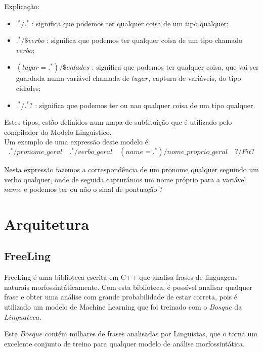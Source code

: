 \documentclass[11pt]{article} %
\begin{document}
Explicação:
\begin{itemize}
\item $.^* / .^*$ : significa que podemos ter qualquer coisa de um tipo qualquer;
\item $. ^* / \$verbo$ : significa que podemos ter qualquer coisa de um tipo chamado $verbo$;
\item $(lugar=.^*) / \$cidades$ : significa que podemos ter qualquer coisa, que vai ser guardada numa variável chamada de $lugar$, captura de variáveis, do tipo cidades;
\item  $.^* / .^* ?$ : significa que podemos ter ou nao qualquer coisa de um tipo qualquer.\\
\end{itemize}

Estes tipos, estão definidos num mapa de subtituição que é utilizado pelo compilador do Modelo Linguístico.\\

Um exemplo de uma expressão deste modelo é:
\begin{equation}
.^* /  pronome\_geral \quad  .^* /  verbo\_geral \quad (name=.^*) / nome\_proprio\_geral \quad  ? / Fit ?
\end{equation}

Nesta expressão fazemos a correspondência de um pronome qualquer seguindo um verbo qualquer, onde de seguida capturámos um nome próprio para a variável $name$ e podemos ter ou não o sinal de pontuação $?$

\section{Arquitetura}

\hspace{11pt} 

\subsection{FreeLing}

\hspace{11pt} FreeLing é uma biblioteca escrita em C++ que analisa frases de linguagens naturais morfossintáticamente. Com esta biblioteca, é possível analisar qualquer frase e obter uma análise com grande probabilidade de estar correta, pois é utilizado um modelo de Machine Learning que foi treinado com o $Bosque$ da $Linguateca$.

Este $Bosque$ contém milhares de frases analisadas por Linguístas,  que o torna um excelente conjunto de treino para qualquer modelo de análise morfossintática.
\end{document}
